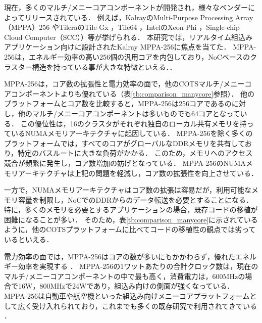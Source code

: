 \documentclass[submit,techrep]{ipsj_v2/UTF8/ipsj}
\begin{document}
現在，多くのマルチ/メニーコアコンポーネントが開発され，様々なベンダーによってリリースされている．
例えば，KalrayのMulti-Purpose Processing Array（MPPA）256 \cite{de2014time}やTileraのTile-Gx \cite{ramey2011tile} \cite{schooler2010tile}，Tile64 \cite{bell2008tile64}，IntelのXeon Phi \cite{chrysos2014intel} \cite{chrysos2012intel}，Single-chip Cloud Computer（SCC）\cite{baron2010single}）等が挙げられる．
本研究では，リアルタイム組込みアプリケーション向けに設計されたKalray MPPA-256に焦点を当てた．
MPPA-256は，エネルギー効率の高い256個の汎用コアを内包しており，NoCベースのクラスター構造を持っている事が大きな特徴といえる．．

MPPA-256は，コア数の拡張性と電力効率の面で，他のCOTSマルチ/メニーコアコンポーネントよりも優れている（表\ref{tb:comparison_manycore}参照）．
他のプラットフォームとコア数を比較すると，MPPA-256は256コアであるのに対し，他のマルチ/メニーコアコンポーネントは多いものでも64コアとなっている．
この優位性は，16のクラスタがそれぞれ独自のローカル共有メモリを持っているNUMAメモリアーキテクチャに起因している．
MPPA-256を除く多くのプラットフォームでは，すべてのコアがグローバルなDDRメモリを共有しており，特定のバスルートに大きな負荷がかかる．
このため，メモリへのアクセス競合が頻繁に発生し，コア数増加の妨げとなっている．
MPPA-256のNUMAメモリアーキテクチャは上記の問題を軽減し，コア数の拡張性を向上させている．

一方で，NUMAメモリアーキテクチャはコア数の拡張は容易だが，利用可能なメモリ容量を制限し，NoCでのDDRからのデータ転送を必要とすることになる．
特に，多くのメモリを必要とするアプリケーションの場合，既存コードの移植が困難になることが多い．
そのため，表\ref{tb:comparison_manycore}に示されているように，他のCOTSプラットフォームに比べてコードの移植性の観点では劣っているといえる．

電力効率の面では，MPPA-256はコアの数が多いにもかかわらず，優れたエネルギー効率を実現する \cite{kanter2015kalray}．
MPPA-256の1ワットあたりの合計クロック数は，現在のマルチ/メニーコアコンポーネントの中で最も高く，消費電力は，600MHzの場合で16W，800MHzで24Wであり，組込み向けの側面が強くなっている．
MPPA-256は自動車や航空機といった組込み向けメニーコアプラットフォームとして広く受け入れられており，これまでも多くの既存研究で利用されてきている \cite{carle2014static} \cite{perret2016mapping} \cite{perret2016predictable}．
\end{document}
